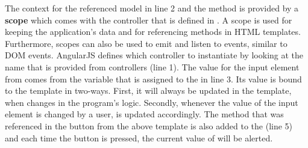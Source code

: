 The context for the referenced model  in line 2 and the method  is provided by a \textbf{scope} which comes with the controller that is defined in . A scope is used for keeping the application's data and for referencing methods in HTML templates. Furthermore, scopes can also be used to emit and listen to events, similar to DOM events. AngularJS defines which controller to instantiate by looking at the name that is provided from controllers (line 1). The value for the input element from  comes from the variable that is assigned to the  in line 3. Its value is bound to the template in two-ways. First, it will always be updated in the template, when  changes in the program's logic. Secondly, whenever the value of the input element is changed by a user,  is updated accordingly. The method that was referenced in the button from the above template is also added to the  (line 5) and each time the button is pressed, the current value of  will be alerted.